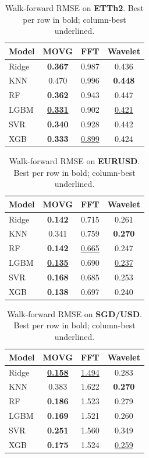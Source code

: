 \documentclass[a4paper,12pt]{article}
\begin{document}
\begin{table}[ht]
\centering
\caption{Walk-forward RMSE on \textbf{ETTh2}. Best per row in bold; column-best underlined.}
\label{tab:per_ds_etth2_oiltemp}
\begin{tabular}{lccc}
\toprule
Model & MOVG & FFT & Wavelet \\
\midrule
Ridge & \textbf{0.367} & 0.987 & 0.436 \\
KNN & 0.470 & 0.996 & \textbf{0.448} \\
RF & \textbf{0.362} & 0.943 & 0.447 \\
LGBM & \underline{\textbf{0.331}} & 0.902 & \underline{0.421} \\
SVR & \textbf{0.340} & 0.928 & 0.442 \\
XGB & \textbf{0.333} & \underline{0.899} & 0.424 \\
\bottomrule
\end{tabular}
\end{table}

\begin{table}[ht]
\centering
\caption{Walk-forward RMSE on \textbf{EURUSD}. Best per row in bold; column-best underlined.}
\label{tab:per_ds_eurusd_close}
\begin{tabular}{lccc}
\toprule
Model & MOVG & FFT & Wavelet \\
\midrule
Ridge & \textbf{0.142} & 0.715 & 0.261 \\
KNN & 0.341 & 0.759 & \textbf{0.270} \\
RF & \textbf{0.142} & \underline{0.665} & 0.247 \\
LGBM & \underline{\textbf{0.135}} & 0.690 & \underline{0.237} \\
SVR & \textbf{0.168} & 0.685 & 0.253 \\
XGB & \textbf{0.138} & 0.697 & 0.240 \\
\bottomrule
\end{tabular}
\end{table}

\begin{table}[ht]
\centering
\caption{Walk-forward RMSE on \textbf{SGD/USD}. Best per row in bold; column-best underlined.}
\label{tab:per_ds_exchange_sgd}
\begin{tabular}{lccc}
\toprule
Model & MOVG & FFT & Wavelet \\
\midrule
Ridge & \underline{\textbf{0.158}} & \underline{1.494} & 0.283 \\
KNN & 0.383 & 1.622 & \textbf{0.270} \\
RF & \textbf{0.186} & 1.523 & 0.279 \\
LGBM & \textbf{0.169} & 1.521 & 0.260 \\
SVR & \textbf{0.251} & 1.560 & 0.349 \\
XGB & \textbf{0.175} & 1.524 & \underline{0.259} \\
\bottomrule
\end{tabular}
\end{table}
\end{document}
